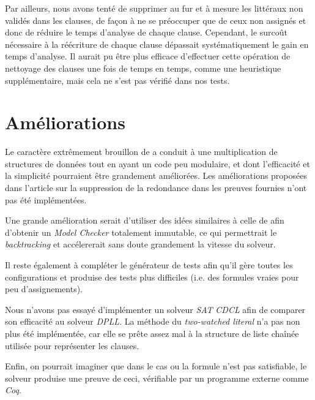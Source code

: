 \documentclass[a4paper, 10pt, french]{article}
\newcommand{\foreign}[1]{\emph{#1}}
\begin{document}
Par ailleurs, nous avons tenté de supprimer au fur et à mesure les littéraux non validés dans les clauses, de façon à ne se préoccuper que de ceux non assignés et donc de réduire le temps d'analyse de chaque clause. Cependant, le surcoût nécessaire à la réécriture de chaque clause dépassait systématiquement le gain en temps d'analyse. Il aurait pu être plus efficace d'effectuer cette opération de nettoyage des clauses une fois de temps en temps, comme une heuristique supplémentaire, mais cela ne s'est pas vérifié dans nos tests.

\section{Améliorations}

Le caractère extrêmement brouillon de \cite{ExplainUF} a conduit à une 
multiplication de structures de données tout en ayant un code peu modulaire, et 
dont l'efficacité et la simplicité pourraient être grandement améliorées. Les 
améliorations proposées dans l'article sur la suppression de la redondance dans 
les preuves fournies n'ont pas été implémentées.

Une grande amélioration serait d'utiliser des idées similaires à celle de 
\cite{PersistentUF} afin d'obtenir un \foreign{Model Checker} totalement 
immutable, ce qui permettrait le \foreign{backtracking} et accélererait sans 
doute grandement la vitesse du solveur.

Il reste également à compléter le générateur de tests afin qu'il gère toutes 
les configurations et produise des tests plus difficiles (i.e. des formules 
vraies pour peu d'assignements).

Nous n'avons pas essayé d'implémenter un solveur \foreign{SAT} \foreign{CDCL} 
afin de comparer son efficacité au solveur \foreign{DPLL}. La méthode du \foreign{two-watched literal} n'a pas non plus été implémentée, car elle se prête assez mal à la structure de liste chaînée utilisée pour représenter les clauses.

Enfin, on pourrait imaginer que dans le cas ou la formule n'est pas satisfiable, le solveur produise une preuve de ceci, vérifiable par un programme externe comme \foreign{Coq}.




\end{document}
